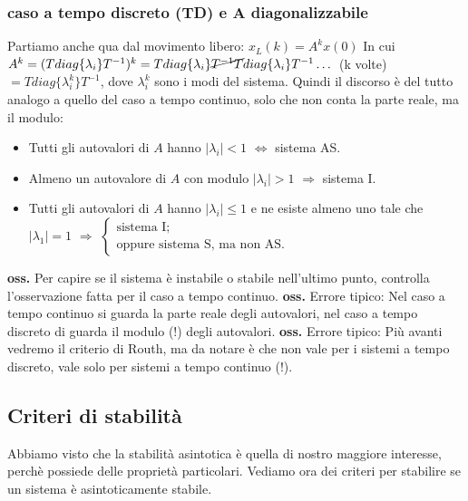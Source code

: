 \subsubsection*{caso a tempo discreto (TD) e A diagonalizzabile}
Partiamo anche qua dal movimento libero: $x_L(k) = A^k x(0)$\newline
\newline
In cui $A^k = (T diag\{\lambda_i\} T^{-1})^k = T diag\{\lambda_i\}\cancel{T^{-1}T} diag\{\lambda_i\} T^{-1} \dots$ (k volte) $= T diag\{\lambda_i^k\}T^{-1}$, dove $\lambda_i^{k}$ sono i modi del sistema.\newline
\newline
Quindi il discorso è del tutto analogo a quello del caso a tempo continuo, solo che non conta la parte reale, ma il modulo:
\begin{itemize}
    \item Tutti gli autovalori di $A$ hanno $|\lambda_i| < 1$ $\Longleftrightarrow$ sistema AS.
    \item Almeno un autovalore di $A$ con modulo $|\lambda_i| > 1$ $\Longrightarrow$ sistema I.
    \item Tutti gli autovalori di $A$ hanno $|\lambda_i| \leq 1$ e ne esiste almeno uno tale che $|\lambda_1| = 1$ $\Longrightarrow$ $\begin{cases}
        \text{sistema I;}\;\\
        \text{oppure sistema S, ma non AS.}\;
    \end{cases}$
\end{itemize}
\textbf{oss.} Per capire se il sistema è instabile o stabile nell'ultimo punto, controlla l'osservazione fatta per il caso a tempo continuo.\newline
\newline
\textbf{oss.} Errore tipico: Nel caso a tempo continuo si guarda la parte reale degli autovalori, nel caso a tempo discreto di guarda il modulo (!) degli autovalori.\newline
\newline
\textbf{oss.} Errore tipico: Più avanti vedremo il criterio di Routh, ma da notare è che non vale per i sistemi a tempo discreto, vale solo per sistemi a tempo continuo (!).
\subsection{Criteri di stabilità}
Abbiamo visto che la stabilità asintotica è quella di nostro maggiore interesse, perchè possiede delle proprietà particolari. Vediamo ora dei criteri per stabilire se un sistema è asintoticamente stabile.

